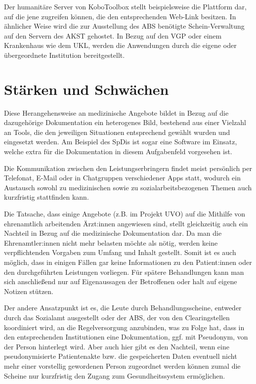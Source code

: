 Der humanitäre Server von KoboToolbox stellt beispielsweise die Plattform dar, auf die jene zugreifen können, die den entsprechenden Web-Link besitzen. In ähnlicher Weise wird die zur Ausstellung des \ac{ABS} benötigte Schein-Verwaltung auf den Servern des \ac{AKST} gehostet. In Bezug auf den \ac{VGP} oder einem Krankenhaus wie dem \ac{UKL}, werden die Anwendungen durch die eigene oder übergeordnete Institution bereitgestellt.


\section{Stärken und Schwächen}\label{sec:analysis}

Diese Herangehensweise an medizinische Angebote bildet in Bezug auf die dazugehörige Dokumentation ein heterogenes Bild, bestehend aus einer Vielzahl an Tools, die den jeweiligen Situationen entsprechend gewählt wurden und eingesetzt werden. Am Beispiel des \acp{SpDi} ist sogar eine Software im Einsatz, welche extra für die Dokumentation in diesem Aufgabenfeld vorgesehen ist.

Die Kommunikation zwischen den Leistungserbringern findet meist persönlich per Telefonat, E-Mail oder in Chatgruppen verschiedener Apps statt, wodurch ein Austausch sowohl zu medizinischen sowie zu sozialarbeitsbezogenen Themen auch kurzfristig stattfinden kann.

Die Tatsache, dass einige Angebote (z.B. im Projekt \ac{UVO}) auf die Mithilfe von ehrenamtlich arbeitenden Ärzt:innen angewiesen sind, stellt gleichzeitig auch ein Nachteil in Bezug auf die medizinische Dokumentation dar. Da man die Ehrenamtler:innen nicht mehr belasten möchte als nötig, werden keine verpflichtenden Vorgaben zum Umfang und Inhalt gestellt. Somit ist es auch möglich, dass in einigen Fällen gar keine Informationen zu den Patient:innen oder den durchgeführten Leistungen vorliegen. Für spätere Behandlungen kann man sich anschließend nur auf Eigenaussagen der Betroffenen oder halt auf eigene Notizen stützen.

Der andere Ansatzpunkt ist es, die Leute durch Behandlungsscheine, entweder durch das Sozialamt ausgestellt oder der \ac{ABS}, der von den Clearingstellen koordiniert wird, an die Regelversorgung anzubinden, was zu Folge hat, dass in den entsprechenden Institutionen eine Dokumentation, ggf. mit Pseudonym, von der Person hinterlegt wird. Aber auch hier gibt es den Nachteil, wenn eine pseudonymisierte Patientenakte bzw. die gespeicherten Daten eventuell nicht mehr einer vorstellig gewordenen Person zugeordnet werden können zumal die Scheine nur kurzfristig den Zugang zum Gesundheitssystem ermöglichen.


